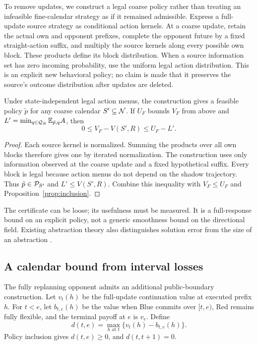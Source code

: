 To remove updates, we construct a legal coarse policy rather than treating
an infeasible fine-calendar strategy as if it remained admissible. Express
a full-update source strategy as conditional action kernels. At a coarse
update, retain the actual own and opponent prefixes, complete the opponent
future by a fixed straight-action suffix, and multiply the source kernels
along every possible own block. These products define its block distribution.
When a source information set has zero incoming probability, use the uniform
legal action distribution. This is an explicit new behavioral policy; no
claim is made that it preserves the source's outcome distribution after
updates are deleted.

\begin{theorem}\label{thm:deletion}
Under state-independent legal action menus, the construction gives a feasible
policy $\tilde p$ for any coarse calendar $S'\subseteq\mathcal N$. If $U_F$ bounds
$V_F$ from above and
$L'=\min_{q\in\mathcal Q_R}\mathbb E_{\tilde p,q}A$, then
\begin{equation}
 0\le V_F-V(S',R)\le U_F-L'.
 \label{eq:loss}
\end{equation}
\end{theorem}
\begin{proof}
Each source kernel is normalized. Summing the products over all own blocks
therefore gives one by iterated normalization. The construction uses only
information observed at the coarse update and a fixed hypothetical suffix.
Every block is legal because action menus do not depend on the shadow
trajectory. Thus $\tilde p\in\mathcal P_{S'}$ and $L'\le V(S',R)$. Combine this
inequality with $V_F\le U_F$ and Proposition~\ref{prop:inclusion}.
\end{proof}
The certificate can be loose; its usefulness must be measured. It is a
full-response bound on an explicit policy, not a generic smoothness bound
on the directional field. Existing abstraction theory also distinguishes
solution error from the size of an abstraction \citep{kroer2018}.

\subsection{A calendar bound from interval losses}
The fully replanning opponent admits an additional public-boundary construction.
Let $v_t(h)$ be the full-update continuation value at executed prefix $h$.
For $t<e$, let $b_{t,e}(h)$ be the value when Blue commits over $[t,e)$,
Red remains fully flexible, and the terminal payoff at $e$ is $v_e$.
Define
\begin{equation}
 d(t,e)=\max_{h\text{ at }t}\{v_t(h)-b_{t,e}(h)\}.
 \label{eq:intervalcost}
\end{equation}
Policy inclusion gives $d(t,e)\ge0$, and $d(t,t+1)=0$.

